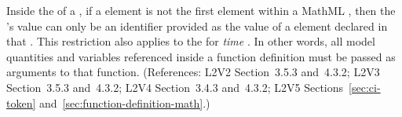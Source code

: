 Inside the  of a \FunctionDefinition, if a  element
is not the first element within a MathML , then the
's value can only be an identifier provided as the
value of a  element declared in that .
This restriction also applies to the  for \emph{time} .
In other words, all model quantities and variables referenced
inside a function definition must be passed as arguments to that function.
(References: L2V2 Section~3.5.3 and~4.3.2; L2V3 Section~3.5.3 and~4.3.2; L2V4 Section~3.4.3 and~4.3.2;
L2V5 Sections~\ref{sec:ci-token} and~\ref{sec:function-definition-math}.)
